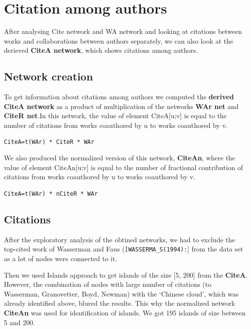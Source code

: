 \documentclass[11pt]{article} %
\begin{document}

\section{Citation among authors}

After analysing Cite network and WA network and looking at citations between works and collaborations between authors separately, we can also look at the derieved \textbf{CiteA network}, which shows citations among authors. \medskip 

\subsection{Network creation} 

To get information about citations among authors we computed the \textbf{derived CiteA network} as a product of multiplication of the networks \textbf{WAr net} and \textbf{CiteR net}.In this network, the value of element CiteA[u;v] is equal to the number of citations from works coauthored by u to works coauthored by v.

\texttt{CiteA=t(WAr) * CiteR * WAr}

We also produced the normalized version of this network, \textbf{CiteAn}, where the value of element CiteAn[u;v] is equal to the number of {fractional} contribution of citations from works coauthored by u to works coauthored by v.\medskip 

\texttt{CiteA=t(WAr) * nCiteR * WAr}

\subsection{Citations} 

After the exploratory analysis of the obtined networks, we had to exclude the top-cited work of Wasserman and Faus (\texttt{[WASSERMA\_S(1994):}] from the data set as a lot of nodes were connected to it. \medskip 

Then we used Islands approach to get islands of the size [5, 200] from the \textbf{CiteA}. However, the combination of nodes with large number of citations (to Wasserman, Granovetter, Boyd, Newman) with the `Chinese cloud', which was already identified above, blured the results. This why the normalized network \textbf{CiteAn} was used for identification of islands. We got 195 islands of size between 5 and 200. \medskip 
\end{document}
